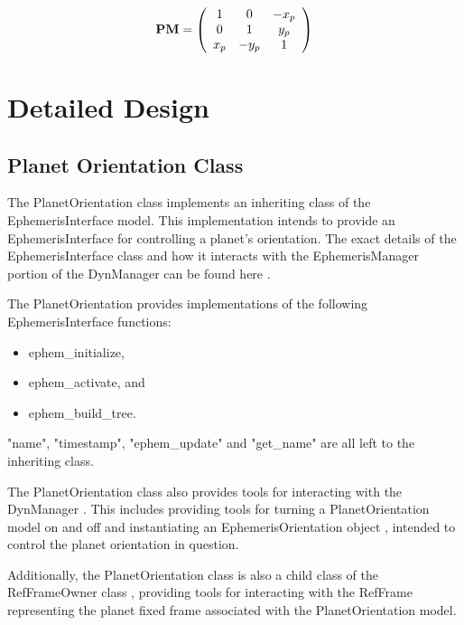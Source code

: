 \begin{equation}\label{simple_polar_motion_rot}
{\bf PM} = 
 \left( \begin{array} {ccc}
1            & 0         & -x_p \\
0 & 1  & y_p  \\
x_p & -y_p & 1 \end{array} \right) 
\end{equation}

\section{Detailed Design}

\subsection{Planet Orientation Class}

The PlanetOrientation class implements an inheriting class of the
EphemerisInterface model. This implementation intends to provide
an EphemerisInterface for controlling a planet's orientation.
The exact details of the EphemerisInterface class and how it interacts with
the EphemerisManager portion of the DynManager can be found here \cite{dynenv:EPHEMERIDES}.

The PlanetOrientation provides implementations of the following
EphemerisInterface functions:

\begin{itemize}
\item{ephem\_initialize,}
\item{ephem\_activate, and}
\item{ephem\_build\_tree.}
\end{itemize}

"name", "timestamp", "ephem\_update" and "get\_name"
are all left to the inheriting class.

The PlanetOrientation class also provides tools for interacting with
the DynManager \cite{dynenv:DYNMANAGER}.
This includes providing tools for turning a PlanetOrientation model
on and off and instantiating an EphemerisOrientation
object \cite{dynenv:EPHEMERIDES}, intended to control the planet orientation
in question.

Additionally, the PlanetOrientation class is also a child class of the RefFrameOwner
class \cite{dynenv:REFFRAMES}, providing tools for interacting with the RefFrame
representing the planet fixed frame associated with the PlanetOrientation model.

